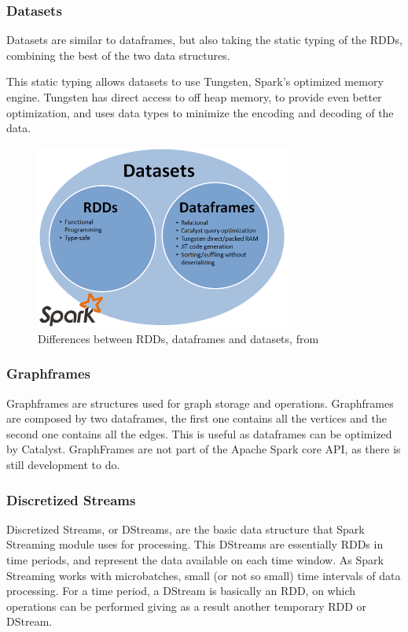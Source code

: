 \documentclass[11pt]{book} %
\begin{document}
      \subsubsection{Datasets}

        Datasets are similar to dataframes, but also taking the static typing of the RDDs, combining the best of the two data structures.

        This static typing allows datasets to use Tungsten, Spark's optimized memory engine. Tungsten has direct access to off heap memory, to provide even better optimization, and uses data types to minimize the encoding and decoding of the data.

      \begin{figure}[!ht]
        \centering
        \includegraphics[width=0.75\textwidth]{RDD_dataframes_datasets_diagram.png}
        \caption{Differences between RDDs, dataframes and datasets, from \cite{RDD_dataframes_datasets_diagram_blog}}
        \label{img:RDD_dataframes_datasets_diagram}
      \end{figure}

      \subsubsection{Graphframes}

        Graphframes are structures used for graph storage and operations. Graphframes are composed by two dataframes, the first one contains all the vertices and the second one contains all the edges. This is useful as dataframes can be optimized by Catalyst. GraphFrames are not part of the Apache Spark core API, as there is still development to do.

      \subsubsection{Discretized Streams}
        Discretized Streams, or DStreams, are the basic data structure that Spark Streaming module uses for processing. This DStreams are essentially RDDs in time periods, and represent the data available on each time window. As Spark Streaming works with microbatches, small (or not so small) time intervals of data processing. For a time period, a DStream is basically an RDD, on which operations can be performed giving as a result another temporary RDD or DStream.
\end{document}

